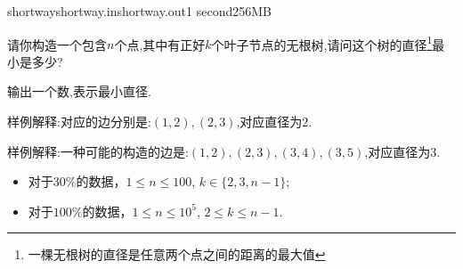 \documentclass[11pt,a4paper,oneside]{article}
\begin{document}
\begin{problem}{shortway}{shortway.in}{shortway.out}{1 second}{256MB}

    请你构造一个包含$n$个点,其中有正好$k$个叶子节点的无根树,请问这个树的直径\footnote{一棵无根树的直径是任意两个点之间的距离的最大值}最小是多少?

    \OutputFile

	输出一个数,表示最小直径.

    \Example

    \begin{example}
    \end{example}

	样例解释:对应的边分别是:$(1,2), (2,3)$,对应直径为$2$.

    \begin{example}
	\end{example}

	样例解释:一种可能的构造的边是:$(1,2), (2,3), (3,4), (3,5)$,对应直径为$3$.

    \Note
    
    \begin{itemize}
		\item 对于$30\%$的数据，$1 \leq n \leq 100$, $k \in \{ 2, 3, n - 1 \}$;
		\item 对于$100\%$的数据，$1 \leq n \leq 10^5$, $2 \leq k \leq n-1$.
    \end{itemize}

\end{problem}
\end{document}
